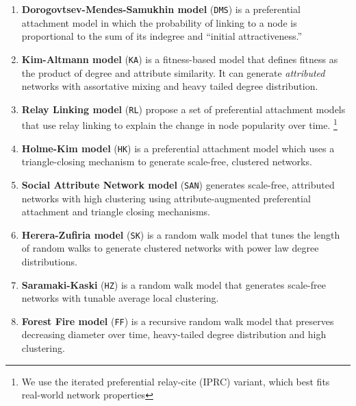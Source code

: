 \begin{enumerate}
    \item{\textbf{Dorogovtsev-Mendes-Samukhin model}} \cite{dorogovtsev2000structure}  (\texttt{DMS})
    is a preferential attachment model in which the probability of linking to a node is proportional
    to the sum of its indegree and ``initial attractiveness.''

    \item{\textbf{Kim-Altmann model}} \cite{kim2017effect} (\texttt{KA}) is a fitness-based model that defines
    fitness as the product of degree and attribute similarity. It can generate \textit{attributed} networks with assortative mixing and
    heavy tailed degree distribution.

    \item{\textbf{Relay Linking model}} \cite{singh2017relay} (\texttt{RL}) propose a set of
    preferential attachment models that use relay linking to explain the change in node popularity over time.
    \footnote{We use the iterated preferential relay-cite (IPRC) variant, which best fits real-world network properties}

    \item{\textbf{Holme-Kim model}} \cite{holme2002growing} (\texttt{HK}) is a preferential attachment model
    which uses a triangle-closing mechanism to generate scale-free, clustered networks.

    \item{\textbf{Social Attribute Network model}} \cite{gong2012evolution} (\texttt{SAN}) generates
    scale-free, attributed networks with high clustering using attribute-augmented
    preferential attachment and triangle closing mechanisms.


    \item{\textbf{Herera-Zufiria model}} \cite{saramaki2004scale} (\texttt{SK})  is a random walk model
    that tunes the length of random walks to generate clustered networks with power law degree distributions.

    \item{\textbf{Saramaki-Kaski}} \cite{herrera2011generating} (\texttt{HZ}) is a random walk model
    that generates scale-free networks with tunable average local clustering.

    \item{\textbf{Forest Fire model}} \cite{leskovec2005graphs} (\texttt{FF}) is a recursive random walk model
    that preserves decreasing diameter over time, heavy-tailed degree distribution
    and high clustering.
\end{enumerate}

